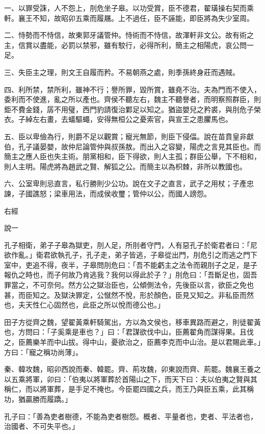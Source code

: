 
\begin{pinyinscope}
一、以罪受誅，人不怨上，刖危坐子皋。以功受賞，臣不德君，翟璜操右契而乘軒。襄王不知，故昭卯五乘而履屩。上不過任，臣不誣能，即臣將為失少室周。

二、恃勢而不恃信，故東郭牙議管仲。恃術而不恃信，故渾軒非文公。故有術之主，信賞以盡能，必罰以禁邪，雖有駮行，必得所利，簡主之相陽虎，哀公問一足。

三、失臣主之理，則文王自履而矜。不易朝燕之處，則季孫終身莊而遇賊。

四、利所禁，禁所利，雖神不行；譽所罪，毀所賞，雖堯不治。夫為門而不使入，委利而不使進，亂之所以產也。齊侯不聽左右，魏主不聽譽者，而明察照群臣，則鉅不費金錢，孱不用璧，西門豹請復治鄴足以知之。猶盜嬰兒之矜裘，與刖危子榮衣。子綽左右畫，去蟻驅蠅，安得無桓公之憂索官，與宣王之患臞馬也。

五、臣以卑儉為行，則爵不足以觀賞；寵光無節，則臣下侵偪。說在苗賁皇非獻伯，孔子議晏嬰，故仲尼論管仲與叔孫敖。而出入之容變，陽虎之言見其臣也。而簡主之應人臣也失主術。朋黨相和，臣下得欲，則人主孤；群臣公舉，下不相和，則人主明。陽虎將為趙武之賢、解狐之公。而簡主以為枳棘，非所以教國也。

六、公室卑則忌直言，私行勝則少公功。說在文子之直言，武子之用杖；子產忠諫，子國譙怒；梁車用法，而成侯收璽；管仲以公，而國人謗怨。

右經

說一

孔子相衛，弟子子皋為獄吏，刖人足，所刖者守門，人有惡孔子於衛君者曰：「尼欲作亂。」衛君欲執孔子，孔子走，弟子皆逃，子皋從出門，刖危引之而逃之門下室中，吏追不得，夜半，子皋問刖危曰：「吾不能虧主之法令而親刖子之足，是子報仇之時也，而子何故乃肯逃我？我何以得此於子？」刖危曰：「吾斷足也，固吾罪當之，不可奈何。然方公之獄治臣也，公傾側法令，先後臣以言，欲臣之免也甚，而臣知之。及獄決罪定，公憱然不悅，形於顏色，臣見又知之。非私臣而然也，夫天性仁心固然也，此臣之所以悅而德公也。」

田子方從齊之魏，望翟黃乘軒騎駕出，方以為文侯也，移車異路而避之，則徒翟黃也，方問曰：「子奚乘是車也？」曰：「君謀欲伐中山，臣薦翟角而謀得果。且伐之，臣薦樂羊而中山拔。得中山，憂欲治之，臣薦李克而中山治。是以君賜此車。」方曰：「寵之稱功尚薄」。

秦、韓攻魏，昭卯西說而秦、韓罷。齊、荊攻魏，卯東說而齊、荊罷。魏襄王養之以五乘將軍，卯曰：「伯夷以將軍葬於首陽山之下，而天下曰：夫以伯夷之賢與其稱仁，而以將軍葬，是手足不掩也。今臣罷四國之兵，而王乃與臣五乘，此其稱功，猶贏勝而履蹻。」

孔子曰：「善為吏者樹德，不能為吏者樹怨。概者、平量者也，吏者、平法者也，治國者、不可失平也。」


\end{pinyinscope}
